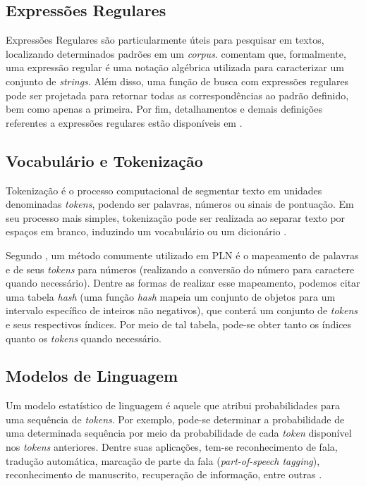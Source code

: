\documentclass[twoside]{automatextcc}
\begin{document}
\subsection{Expressões Regulares}
Expressões Regulares são particularmente úteis para pesquisar em textos, localizando determinados padrões em um \textit{corpus}. \citet{jurafsky2021} comentam que, formalmente, uma expressão regular é uma notação algébrica utilizada para caracterizar um conjunto de \textit{strings}. Além disso, uma função de busca com expressões regulares pode ser projetada para retornar todas as correspondências ao padrão definido, bem como apenas a primeira. Por fim, detalhamentos e demais definições referentes a expressões regulares estão disponíveis em \citet{jurafsky2021}.



\subsection{Vocabulário e Tokenização}
Tokenização é o processo computacional de segmentar texto em unidades denominadas \textit{tokens}, podendo ser palavras, números ou sinais de pontuação. Em seu processo mais simples, tokenização pode ser realizada ao separar texto por espaços em branco, induzindo um vocabulário ou um dicionário \citep{kamath2019, jurafsky2021}.

Segundo \citet{manning1999}, um método comumente utilizado em PLN é o mapeamento de palavras e de seus \textit{tokens} para números (realizando a conversão do número para caractere quando necessário). Dentre as formas de realizar esse mapeamento, podemos citar uma tabela \textit{hash} (uma função \textit{hash} mapeia um conjunto de objetos para um intervalo específico de inteiros não negativos), que conterá um conjunto de \textit{tokens} e seus respectivos índices. Por meio de tal tabela, pode-se obter tanto os índices quanto os \textit{tokens} quando necessário.



\subsection{Modelos de Linguagem}
Um modelo estatístico de linguagem é aquele que atribui probabilidades para uma sequência de \textit{tokens}. Por exemplo, pode-se determinar a probabilidade de uma determinada sequência por meio da probabilidade de cada \textit{token} disponível nos \textit{tokens} anteriores. Dentre suas aplicações, tem-se reconhecimento de fala, tradução automática, marcação de parte da fala (\textit{part-of-speech tagging}), reconhecimento de manuscrito, recuperação de informação, entre outras
\citep{kamath2019, jurafsky2021}.
\end{document}
